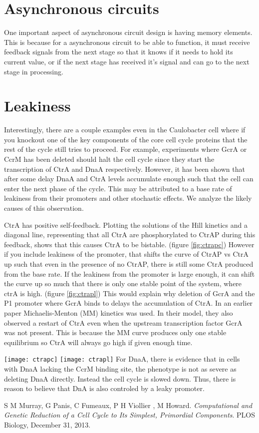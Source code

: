 \documentclass{article}
\begin{document}
\section{Asynchronous circuits}
One important aspect of asynchronous circuit design is having memory elements.  This is because for a asynchronous circuit to be able to function, it must receive feedback signals from the next stage so that it knows if it needs to hold its current value, or if the next stage has received it's signal and can go to the next stage in processing.

\section{Leakiness}
Interestingly, there are a couple examples even in the Caulobacter cell where if you knockout one of the key components of the core cell cycle proteins that the rest of the cycle still tries to proceed.  For example, experiments where GcrA or CcrM has been deleted should halt the cell cycle since they start the transcription of CtrA and DnaA respectively.  However, it has been shown that after some delay DnaA and CtrA levels accumulate enough such that the cell can enter the next phase of the cycle.  This may be attributed to a base rate of leakiness from their promoters and other stochastic effects.  We analyze the likely causes of this observation.

CtrA has positive self-feedback.  Plotting the solutions of the Hill kinetics and a diagonal line, representing that all CtrA are phosphorylated to CtrAP during this feedback, shows that this causes CtrA to be bistable. (figure \ref{fig:ctrapc})  However if you include leakiness of the promoter, that shifts the curve of CtrAP vs CtrA up such that even in the presence of no CtrAP, there is still some CtrA produced from the base rate.  If the leakiness from the promoter is large enough, it can shift the curve up so much that there is only one stable point of the system, where ctrA is high. (figure \ref{fig:ctrapl}) This would explain why deletion of GcrA and the P1 promoter where GcrA binds to delays the accumulation of CtrA.  In an earlier paper \cite{compgenre} Michaelis-Menton (MM) kinetics was used.  In their model, they also observed a restart of CtrA even when the upstream transcription factor GcrA was not present.  This is because the MM curve produces only one stable equilibrium so CtrA will always go high if given enough time.

\texttt{[image: ctrapc]}
\texttt{[image: ctrapl]}
\newline \newline
For DnaA, there is evidence that in cells with DnaA lacking the CcrM binding site, the phenotype is not as severe as deleting DnaA directly.  Instead the cell cycle is slowed down.  Thus, there is reason to believe that DnA is also controled by a leaky promoter.  

\begin{thebibliography}{9}
S M Murray, G Panis, C Fumeaux, P H Viollier , M Howard. 
\textit{Computational and Genetic Reduction of a Cell Cycle to Its Simplest, Primordial Components}. 
PLOS Biology, December 31, 2013.
 
\end{thebibliography}
	
\end{document}

